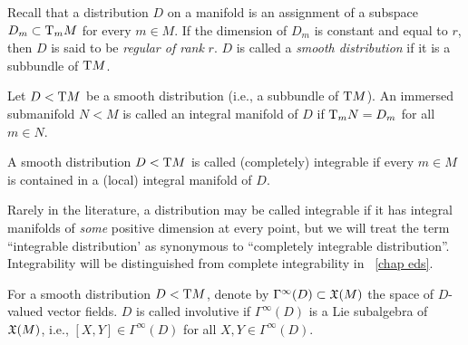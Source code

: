 Recall that a distribution $D$ on a manifold is an assignment of a subspace $D_m\subset \mathrm{T}_m M$ for every $m\in M$. If the dimension of $D_m$ is constant and equal to $r$, then $D$ is said to be \emph{regular of rank} $r$. $D$ is called a \emph{smooth distribution} if it is a subbundle of $\mathrm{T} M$.

\begin{defn}
    Let $D< \mathrm{T} M$ be a smooth distribution (i.e., a subbundle of $\mathrm{T} M$). An immersed submanifold $N<M$ is called an integral manifold of $D$ if $\mathrm{T}_m N=D_m$ for all $m\in N$.
\end{defn}

\begin{defn}
    A smooth distribution $D< \mathrm{T} M$ is called (completely) integrable if every $m\in M$ is contained in a (local) integral manifold of $D$.
\end{defn}

\begin{rem}
    Rarely in the literature, a distribution may be called integrable if it has integral manifolds of \emph{some} positive dimension at every point, but we will treat the term ``integrable distribution' as synonymous to ``completely integrable distribution''. Integrability will be distinguished from complete integrability in \Chap~\ref{chap eds}.
\end{rem}

\begin{defn}
    For a smooth distribution $D< \mathrm{T} M$, denote by $\Gamma^\infty(D)\subset\mathfrak{X}(M)$ the space of $D$-valued vector fields. $D$ is called involutive if $\Gamma^\infty(D)$ is a Lie subalgebra of $\mathfrak{X}(M)$, i.e., $[X,Y]\in\Gamma^\infty(D)$ for all $X,Y\in\Gamma^\infty(D)$.
\end{defn}

